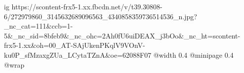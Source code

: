  
 
 
 
 

\ifcmt
  ig https://scontent-frx5-1.xx.fbcdn.net/v/t39.30808-6/272979860_3145632689096563_4340858359736514536_n.jpg?_nc_cat=111&ccb=1-5&_nc_sid=8bfeb9&_nc_ohc=2Ah0fU6uiDEAX_j3bOo&_nc_ht=scontent-frx5-1.xx&oh=00_AT-SAjUkenPKqlV9VOnV-ku0P_sfMzaxgZUa_LCytaTZnA&oe=62088F07
  @width 0.4
  @minipage 0.4
  @wrap \parpic[r]
\fi
